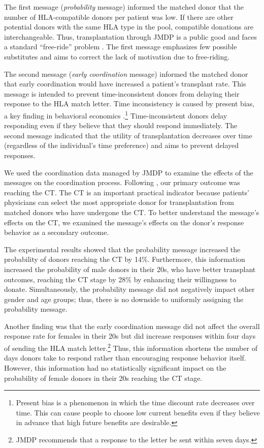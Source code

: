 \documentclass[12pt, a4paper]{article}
\begin{document}
The first message (\emph{probability} message) informed the matched donor that the number of HLA-compatible donors per patient was low. If there are other potential donors with the same HLA type in the pool, compatible donations are interchangeable. Thus, transplantation through JMDP is a public good and faces a standard ``free-ride'' problem \citep{Bergstrom2009}. The first message emphasizes few possible substitutes and aims to correct the lack of motivation due to free-riding.

The second message (\emph{early coordination} message) informed the matched donor that early coordination would have increased a patient's transplant rate. This message is intended to prevent time-inconsistent donors from delaying their response to the HLA match letter. Time inconsistency is caused by present bias, a key finding in behavioral economics \citep{Laibson1997, ODonoghue2001}.\footnote{Present bias is a phenomenon in which the time discount rate decreases over time. This can cause people to choose low current benefits even if they believe in advance that high future benefits are desirable.} Time-inconsistent donors delay responding even if they believe that they should respond immediately. The second message indicated that the utility of transplantation decreases over time (regardless of the individual's time preference) and aims to prevent delayed responses.

We used the coordination data managed by JMDP to examine the effects of the messages on the coordination process. Following \citet{Haylock2024}, our primary outcome was reaching the CT. The CT is an important practical indicator because patients' physicians can select the most appropriate donor for transplantation from matched donors who have undergone the CT. To better understand the message's effects on the CT, we examined the message's effects on the donor's response behavior as a secondary outcome.

The experimental results showed that the probability message increased the probability of donors reaching the CT by 14\%. Furthermore, this information increased the probability of male donors in their 20s, who have better transplant outcomes, reaching the CT stage by 28\% by enhancing their willingness to donate. Simultaneously, the probability message did not negatively impact other gender and age groups; thus, there is no downside to uniformly assigning the probability message.

Another finding was that the early coordination message did not affect the overall response rate for females in their 20s but did increase responses within four days of sending the HLA match letter.\footnote{JMDP recommends that a response to the letter be sent within seven days.} Thus, this information shortens the number of days donors take to respond rather than encouraging response behavior itself. However, this information had no statistically significant impact on the probability of female donors in their 20s reaching the CT stage.
\end{document}
